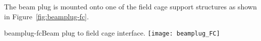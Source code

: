 The beam plug is mounted onto one of the field cage support structures as shown in Figure~\ref{fig:beamplug-fc}. %
\begin{cdrfigure}{beamplug-fc}{Beam plug to field cage interface.}
\texttt{[image: beamplug\_FC]}
\end{cdrfigure}



